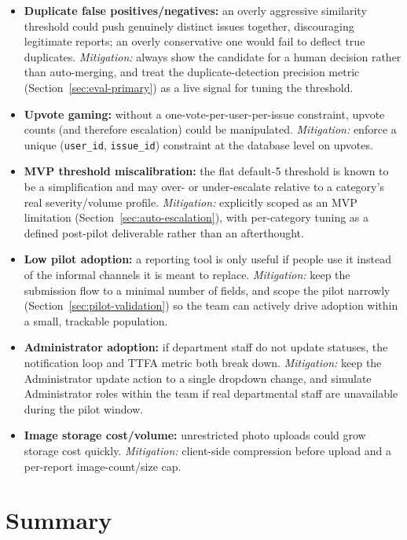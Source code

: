 \documentclass[11pt,a4paper]{article}
\begin{document}
\begin{itemize}[leftmargin=0.7cm]
  \item \textbf{Duplicate false positives/negatives:} an overly
    aggressive similarity threshold could push genuinely distinct
    issues together, discouraging legitimate reports; an overly
    conservative one would fail to deflect true duplicates.
    \emph{Mitigation:} always show the candidate for a human decision
    rather than auto-merging, and treat the duplicate-detection
    precision metric (Section~\ref{sec:eval-primary}) as a live signal
    for tuning the threshold.
  \item \textbf{Upvote gaming:} without a one-vote-per-user-per-issue
    constraint, upvote counts (and therefore escalation) could be
    manipulated. \emph{Mitigation:} enforce a unique
    (\texttt{user\_id}, \texttt{issue\_id}) constraint at the database
    level on upvotes.
  \item \textbf{MVP threshold miscalibration:} the flat default-5
    threshold is known to be a simplification and may over- or
    under-escalate relative to a category's real severity/volume
    profile. \emph{Mitigation:} explicitly scoped as an MVP limitation
    (Section~\ref{sec:auto-escalation}), with per-category tuning as a
    defined post-pilot deliverable rather than an afterthought.
  \item \textbf{Low pilot adoption:} a reporting tool is only useful if
    people use it instead of the informal channels it is meant to
    replace. \emph{Mitigation:} keep the submission flow to a minimal
    number of fields, and scope the pilot narrowly
    (Section~\ref{sec:pilot-validation}) so the team can actively drive
    adoption within a small, trackable population.
  \item \textbf{Administrator adoption:} if department staff do not
    update statuses, the notification loop and TTFA metric both break
    down. \emph{Mitigation:} keep the Administrator update action to a
    single dropdown change, and simulate Administrator roles within the
    team if real departmental staff are unavailable during the pilot
    window.
  \item \textbf{Image storage cost/volume:} unrestricted photo uploads
    could grow storage cost quickly. \emph{Mitigation:} client-side
    compression before upload and a per-report image-count/size cap.
\end{itemize}



\section{Summary}
\end{document}
